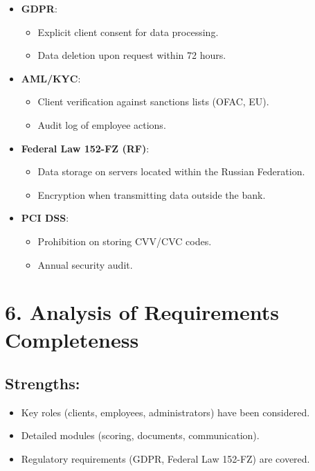 \documentclass[a4paper,12pt]{article}
\begin{document}
\begin{itemize}
    \item \textbf{GDPR}:
    \begin{itemize}
        \item Explicit client consent for data processing.
        \item Data deletion upon request within 72 hours.
    \end{itemize}
    \item \textbf{AML/KYC}:
    \begin{itemize}
        \item Client verification against sanctions lists (OFAC, EU).
        \item Audit log of employee actions.
    \end{itemize}
    \item \textbf{Federal Law 152-FZ (RF)}:
    \begin{itemize}
        \item Data storage on servers located within the Russian Federation.
        \item Encryption when transmitting data outside the bank.
    \end{itemize}
    \item \textbf{PCI DSS}:
    \begin{itemize}
        \item Prohibition on storing CVV/CVC codes.
        \item Annual security audit.
    \end{itemize}
\end{itemize}

\section*{6. Analysis of Requirements Completeness}

\subsection*{Strengths:}
\begin{itemize}
    \item Key roles (clients, employees, administrators) have been considered.
    \item Detailed modules (scoring, documents, communication).
    \item Regulatory requirements (GDPR, Federal Law 152-FZ) are covered.
\end{itemize}
\end{document}
